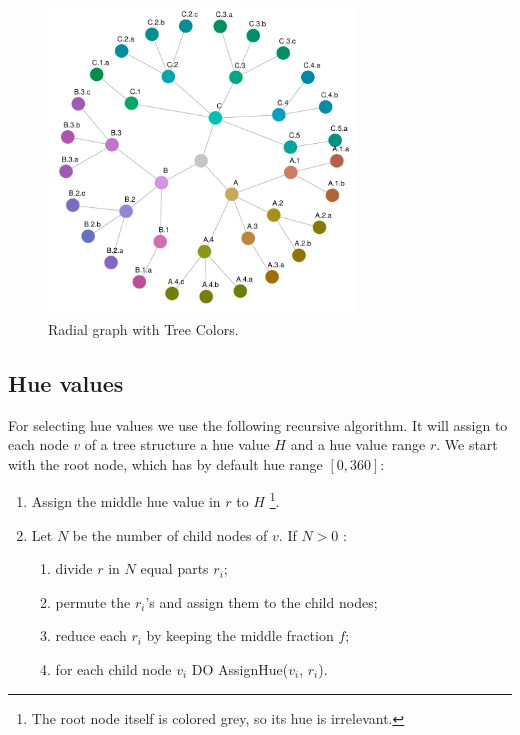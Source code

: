 \documentclass[journal]{vgtc}                %
\begin{document}
\begin{figure}[htb]

  \centering
  \includegraphics[width=3.2in]{HCPgraph.pdf}
  \caption{Radial graph with Tree Colors.}\label{fig:graph}

\end{figure}

\subsection{Hue values}

For selecting hue values we use the following recursive algorithm. It will assign to each node $v$ of a tree structure a hue value $H$ and a hue value range $r$.
We start with the root node, which has by default hue range $[0, 360]$:

\begin{enumerate} \itemsep1pt \parskip0pt 
\item Assign the middle hue value in $r$ to $H$ \footnote{The root node itself is colored grey, so its hue is irrelevant.}.
\item Let $N$ be the number of child nodes of $v$. If $N>0$ :
\begin{enumerate}[i] \itemsep1pt \parskip0pt 
\item divide $r$ in $N$ equal parts $r_i$;
\item permute the $r_i$'s and assign them to the child nodes;
\item reduce each $r_i$ by keeping the middle fraction $f$;
\item for each child node $v_i$ DO AssignHue($v_i$, $r_i$).
\end{enumerate}
\end{enumerate}
\end{document}
